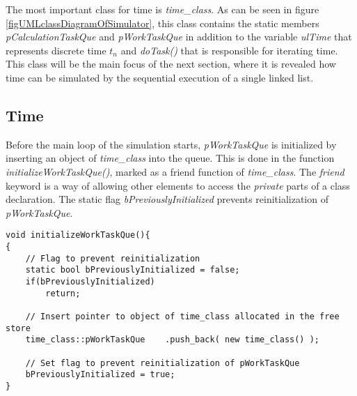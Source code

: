 			The most important class for time is \emph{time\_class}.
			As can be seen in figure \ref{figUMLclassDiagramOfSimulator}, this class contains the static members \emph{pCalculationTaskQue} and \emph{pWorkTaskQue} in addition 
				to the variable \emph{ulTime} that represents discrete time $t_n$ and \emph{doTask()} that is responsible for iterating time.
			This class will be the main focus of the next section, where it is revealed how time can be simulated by the sequential execution of a single linked list.


		\subsection{Time}
		\label{ssecTime}
			Before the main loop of the simulation starts, \emph{pWorkTaskQue} is initialized by inserting an object of \emph{time\_class} into the queue. %
			This is done in the function \emph{initializeWorkTaskQue()}, marked as a friend function of \emph{time\_class}.
			The \emph{friend} keyword is a way of allowing other elements to access the \emph{private} parts of a class declaration\cite{Stroustrup2000KAP11}. 
			The static flag \emph{bPreviouslyInitialized} prevents reinitialization of \emph{pWorkTaskQue}. %
\begin{lstlisting}
void initializeWorkTaskQue(){
{
	// Flag to prevent reinitialization
	static bool bPreviouslyInitialized = false;
	if(bPreviouslyInitialized)
		return;

	// Insert pointer to object of time_class allocated in the free store	 
 	time_class::pWorkTaskQue 	.push_back( new time_class() );

	// Set flag to prevent reinitialization of pWorkTaskQue
	bPreviouslyInitialized = true;
}
\end{lstlisting}
			
